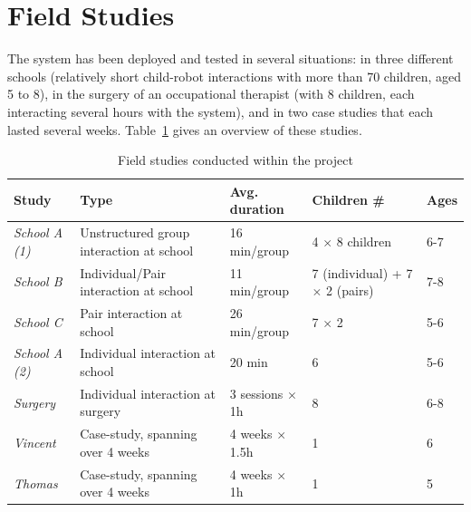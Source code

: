 \documentclass{article}
\begin{document}
\section{Field Studies}

The system has been deployed and tested in several situations: in three
different schools (relatively short child-robot interactions with
more than 70 children, aged 5 to 8), in the surgery of an occupational
therapist (with 8 children, each interacting several hours with the system),
and in two case studies that each lasted several weeks. Table~\ref{studies}
gives an overview of these studies.

\begin{table}[ht!]
\centering
\caption{\small Field studies conducted within the project}
\label{studies}
\footnotesize
\begin{tabular}{@{}lp{4cm}p{2.2cm}p{2cm}l@{}}
\toprule
{\bf Study}        & {\bf Type}                               & {\bf Avg. duration}    & {\bf Children \#}                     & {\bf Ages} \\ \midrule
{\it School A (1)} & Unstructured group interaction at school & 16 min/group           & 4 $\times$ 8 children                 & 6-7        \\
{\it School B}     & Individual/Pair interaction at school    & 11 min/group           & 7 (individual) + 7 $\times$ 2 (pairs) & 7-8        \\
{\it School C}     & Pair interaction at school               & 26 min/group           & 7 $\times$ 2                          & 5-6        \\
{\it School A (2)} & Individual interaction at school         & 20 min                 & 6                                     & 5-6        \\ \midrule
{\it Surgery}      & Individual interaction at surgery        & 3 sessions $\times$ 1h & 8                                     & 6-8        \\ \midrule 
{\it Vincent}      & Case-study, spanning over 4 weeks        & 4 weeks $\times$ 1.5h  & 1                                     & 6          \\
{\it Thomas}       & Case-study, spanning over 4 weeks        & 4 weeks $\times$ 1h    & 1                                     & 5          \\ \bottomrule
\end{tabular}
\end{table}
\end{document}
